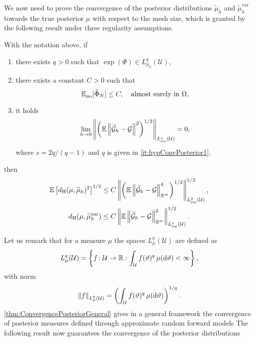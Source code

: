 \documentclass[10pt]{article}
\begin{document}
We now need to prove the convergence of the posterior distributions $\tilde \mu_h$ and $\tilde \mu_h^{\mathrm{var}}$ towards the true posterior $\mu$ with respect to the mesh size, which is granted by the following result under three regularity assumptions.
\begin{theorem}\label{thm:ConvergencePosteriorGeneral} With the notation above, if
	\begin{enumerate}
		\item\label{it:hypConvPosterior1} there exists $q > 0$ such that $\exp(\Phi) \in L_{\mu_0}^q(\mathcal U)$,
		\item\label{it:hypConvPosterior2} there exists a constant $C > 0$ such that
		\begin{equation}
			\operatorname{\mathbb{E}}_{\mu_0} [\widetilde \Phi_N] \leq C, \quad \text{almost surely in } \Omega,
		\end{equation}
		\item\label{it:hypConvPosterior3} it holds
		\begin{equation}
			\lim_{h \to 0} \left\|\left(\operatorname{\mathbb{E}}\left\|\widetilde{\mathcal G}_h - \mathcal G\right\|^2\right)^{1/2}\right\|_{L^s_{\mu_0}(\mathcal U)} = 0,
		\end{equation}
		where $s = 2q / (q-1)$ and $q$ is given in \ref{it:hypConvPosterior1},
	\end{enumerate}
	then 
	\begin{equation}
	\begin{aligned}
		\operatorname{\mathbb{E}}\left[d_{\mathrm{H}}(\mu, \widetilde \mu_h)^2\right]^{1/2} &\leq C \left\|\left(\operatorname{\mathbb{E}}\left\|\widetilde{\mathcal G}_h - \mathcal G\right\|_{\mathbb{R}^m}^4\right)^{1/2}\right\|^{1/2}_{L_{\mu_0}^2(\mathcal U)}, \\
		d_{\mathrm{H}}(\mu, \widetilde \mu_h^{\mathrm{var}}) &\leq C \left\|\operatorname{\mathbb{E}}\left\|\widetilde{\mathcal G}_h - \mathcal G\right\|_{\mathbb{R}^m}^2\right\|^{1/2}_{L_{\mu_0}^s(\mathcal U)}. 
	\end{aligned}
	\end{equation}
\end{theorem}
Let us remark that for a measure $\mu$ the spaces $L_{\mu}^q(\mathcal U)$ are defined as
\begin{equation}
	L_{\mu}^q(\mathcal U) = \left\{f \colon \mathcal U \to \mathbb{R} : \int_{\mathcal U} f(\vartheta)^q \, \mu(\mathrm{d} \vartheta) < \infty \right\},
\end{equation}
with norm 
\begin{equation}
	\left\|f\right\|_{L_{\mu}^q(\mathcal U)} = \left(\int_{\mathcal U} f(\vartheta)^q \, \mu(\mathrm{d} \vartheta) \right)^{1/q}.
\end{equation}
\cref{thm:ConvergencePosteriorGeneral} gives in a general framework the convergence of posterior measures defined through approximate random forward models  
The following result now guarantees the convergence of the posterior distributions
\end{document}
